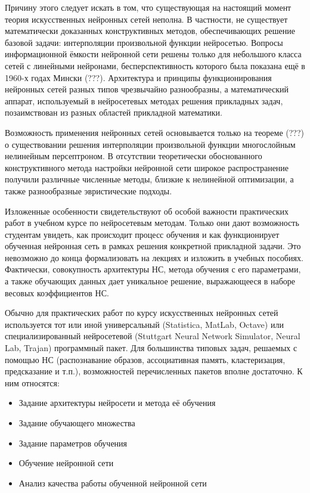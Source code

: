 Причину этого следует искать в том, что существующая на настоящий
момент теория искусственных нейронных сетей неполна.  В частности, не
существует математически доказанных конструктивных методов,
обеспечивающих решение базовой задачи: интерполяции произвольной
функции нейросетью.  Вопросы информационной ёмкости нейронной сети
решены только для небольшого класса сетей с линейными нейронами,
бесперспективность которого была показана ещё в 1960-х годах Мински
(???).  Архитектура и принципы функционирования нейронных сетей разных
типов чрезвычайно разнообразны, а математический аппарат, используемый
в нейросетевых методах решения прикладных задач, позаимствован из
разных областей прикладной математики.

Возможность применения нейронных сетей основывается только на теореме
(???) о существовании решения интерполяции произвольной функции
многослойным нелинейным персептроном.  В отсутствии теоретически
обоснованного конструктивного метода настройки нейронной сети широкое
распространение получили различные численные методы, близкие к
нелинейной оптимизации, а также разнообразные эвристические подходы.

Изложенные особенности свидетельствуют об особой важности практических
работ в учебном курсе по нейросетевым методам.  Только они дают
возможность студентам увидеть, как происходит процесс обучения и как
функционирует обученная нейронная сеть в рамках решения конкретной
прикладной задачи.  Это невозможно до конца формализовать на лекциях и
изложить в учебных пособиях.  Фактически, совокупность архитектуры НС,
метода обучения с его параметрами, а также обучающих данных дает
уникальное решение, выражающееся в наборе весовых коэффициентов НС.


Обычно для практических работ по курсу искусственных нейронных сетей
используется тот или иной универсальный (Statistica, MatLab, Octave)
или специализированный нейросетевой (Stuttgart Neural Network
Simulator, Neural Lab, Trajan) программный пакет.  Для большинства
типовых задач, решаемых с помощью НС (распознавание образов,
ассоциативная память, кластеризация, предсказание и т.п.),
возможностей перечисленных пакетов вполне достаточно.  К ним
относятся:

\begin{itemize}
\item Задание архитектуры нейросети и метода её обучения
\item Задание обучающего множества
\item Задание параметров обучения
\item Обучение нейронной сети
\item Анализ качества работы обученной нейронной сети
\end{itemize}

